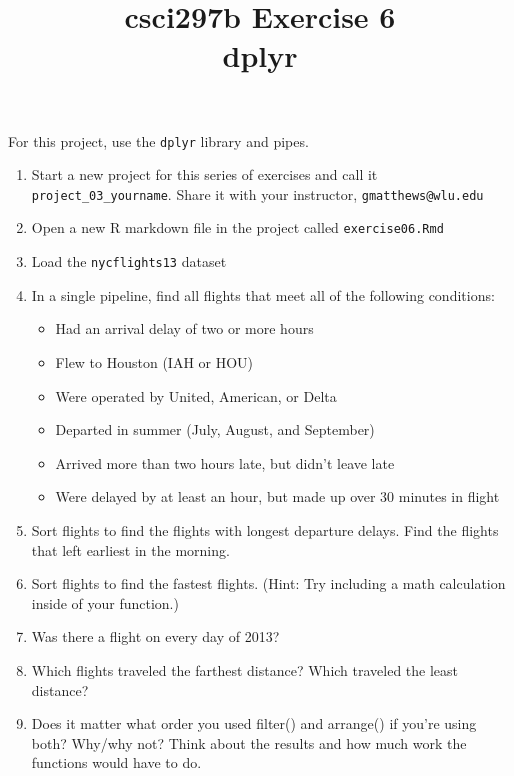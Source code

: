 \documentclass[12pt]{article}
\title{csci297b Exercise 6\\dplyr
  }
\date{}
\newcommand{\bi}{\begin{itemize}}
\newcommand{\ei}{\end{itemize}}
\newcommand{\li}{\item}
\begin{document}
\maketitle

For this project, use the {\tt dplyr} library and pipes.

\begin{enumerate}

\item Start a new project for this series of exercises and call it 
\verb|project_03_yourname|.  Share it with your
instructor, \verb|gmatthews@wlu.edu|


\item Open a new R markdown file in the project called \verb|exercise06.Rmd|

\item Load the {\tt nycflights13} dataset

\item
In a single pipeline, find all flights that meet all of the following conditions:

\bi
\li
Had an arrival delay of two or more hours
\li
Flew to Houston (IAH or HOU)
\li
Were operated by United, American, or Delta
\li
Departed in summer (July, August, and September)
\li
Arrived more than two hours late, but didn’t leave late
\li
Were delayed by at least an hour, but made up over 30 minutes in flight
\ei
\item
Sort flights to find the flights with longest departure delays. Find the flights that left earliest in the morning.
\item
Sort flights to find the fastest flights. (Hint: Try including a math calculation inside of your function.)
\item
Was there a flight on every day of 2013?
\item
Which flights traveled the farthest distance? Which traveled the least distance?
\item
Does it matter what order you used filter() and arrange() if you’re using both? Why/why not? Think about the results and how much work the functions would have to do.

\end{enumerate}
\end{document}
